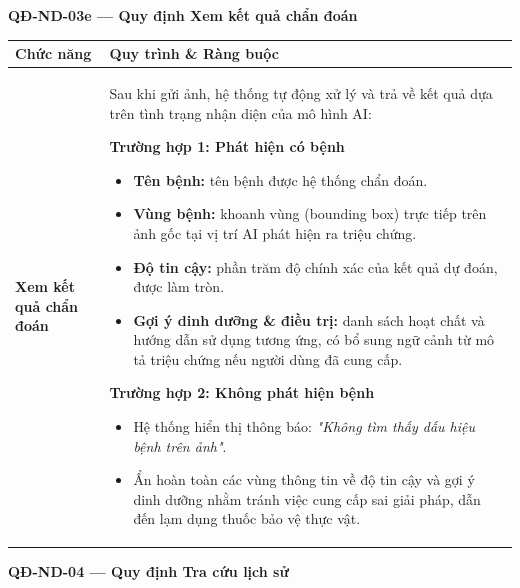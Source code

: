\documentclass[12pt,a4paper]{article}
\begin{document}
\vspace{0.3cm}
\noindent\textbf{QĐ-ND-03e --- Quy định Xem kết quả chẩn đoán}
 
\begin{longtable}{|
    >{\raggedright\arraybackslash}p{2.8cm}|
    >{\raggedright\arraybackslash}p{12cm}|}
\hline
\rowcolor{headerblue}
\textbf{Chức năng} & \textbf{Quy trình \& Ràng buộc} \\
\hline
\endhead
\textbf{Xem kết quả chẩn đoán} &
Sau khi gửi ảnh, hệ thống tự động xử lý và trả về kết quả dựa trên tình trạng nhận diện của mô hình AI:

\vspace{2pt}
\textbf{Trường hợp 1: Phát hiện có bệnh}
\begin{itemize}[leftmargin=*,topsep=2pt,itemsep=1pt]
    \item \textbf{Tên bệnh:} tên bệnh được hệ thống chẩn đoán.
    \item \textbf{Vùng bệnh:} khoanh vùng (bounding box) trực tiếp trên ảnh gốc tại vị trí AI phát hiện ra triệu chứng.
    \item \textbf{Độ tin cậy:} phần trăm độ chính xác của kết quả dự đoán, được làm tròn.
    \item \textbf{Gợi ý dinh dưỡng \& điều trị:} danh sách hoạt chất và hướng dẫn sử dụng tương ứng, có bổ sung ngữ cảnh từ mô tả triệu chứng nếu người dùng đã cung cấp.
\end{itemize}

\vspace{2pt}
\textbf{Trường hợp 2: Không phát hiện bệnh}
\begin{itemize}[leftmargin=*,topsep=2pt,itemsep=1pt]
    \item Hệ thống hiển thị thông báo: \textit{"Không tìm thấy dấu hiệu bệnh trên ảnh"}.
    \item Ẩn hoàn toàn các vùng thông tin về độ tin cậy và gợi ý dinh dưỡng nhằm tránh việc cung cấp sai giải pháp, dẫn đến lạm dụng thuốc bảo vệ thực vật.
\end{itemize} \\
\hline
\end{longtable}

\vspace{0.3cm}
\noindent\textbf{QĐ-ND-04 --- Quy định Tra cứu lịch sử}
\end{document}
